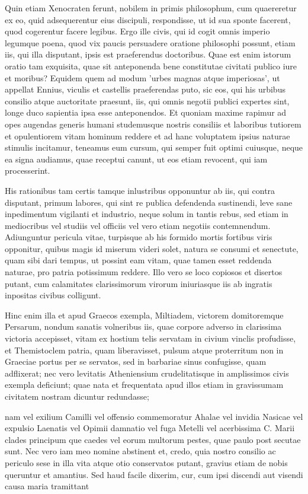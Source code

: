  Quin etiam Xenocraten ferunt, nobilem in primis philosophum, cum quaereretur ex eo, quid adsequerentur eius discipuli, respondisse, ut id sua sponte facerent, quod cogerentur facere legibus. Ergo ille civis, qui id cogit omnis imperio legumque poena, quod vix paucis persuadere oratione philosophi possunt, etiam iis, qui illa disputant, ipsis est praeferendus doctoribus. Quae est enim istorum oratio tam exquisita, quae sit anteponenda bene constitutae civitati publico iure et moribus? Equidem quem ad modum 'urbes magnas atque imperiosas', ut appellat Ennius, viculis et castellis praeferendas puto, sic eos, qui his urbibus consilio atque auctoritate praesunt, iis, qui omnis negotii publici expertes sint, longe duco sapientia ipsa esse anteponendos. Et quoniam maxime rapimur ad opes augendas generis humani studemusque nostris consiliis et laboribus tutiorem et opulentiorem vitam hominum reddere et ad hanc voluptatem ipsius naturae stimulis incitamur, teneamus eum cursum, qui semper fuit optimi cuiusque, neque ea signa audiamus, quae receptui canunt, ut eos etiam revocent, qui iam processerint.

 His rationibus tam certis tamque inlustribus opponuntur ab iis, qui contra disputant, primum labores, qui sint re publica defendenda sustinendi, leve sane inpedimentum vigilanti et industrio, neque solum in tantis rebus, sed etiam in mediocribus vel studiis vel officiis vel vero etiam negotiis contemnendum. Adiunguntur pericula vitae, turpisque ab his formido mortis fortibus viris opponitur, quibus magis id miserum videri solet, natura se consumi et senectute, quam sibi dari tempus, ut possint eam vitam, quae tamen esset reddenda naturae, pro patria potissimum reddere. Illo vero se loco copiosos et disertos putant, cum calamitates clarissimorum virorum iniuriasque iis ab ingratis inpositas civibus colligunt.

 Hinc enim illa et apud Graecos exempla, Miltiadem, victorem domitoremque Persarum, nondum sanatis volneribus iis, quae corpore adverso in clarissima victoria accepisset, vitam ex hostium telis servatam in civium vinclis profudisse, et Themistoclem patria, quam liberavisset, pulsum atque proterritum non in Graeciae portus per se servatos, sed in barbariae sinus confugisse, quam adflixerat; nec vero levitatis Atheniensium crudelitatisque in amplissimos civis exempla deficiunt; quae nata et frequentata apud illos etiam in gravissumam civitatem nostram dicuntur redundasse;

 nam vel exilium Camilli vel offensio commemoratur Ahalae vel invidia Nasicae vel expulsio Laenatis vel Opimii damnatio vel fuga Metelli vel acerbissima C. Marii clades principum que caedes vel eorum multorum pestes, quae paulo post secutae sunt. Nec vero iam meo nomine abstinent et, credo, quia nostro consilio ac periculo sese in illa vita atque otio conservatos putant, gravius etiam de nobis queruntur et amantius. Sed haud facile dixerim, cur, cum ipsi discendi aut visendi causa maria tramittant

